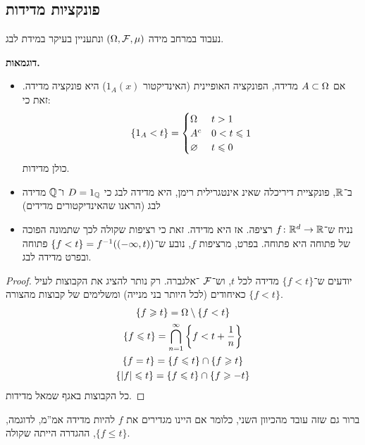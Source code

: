 \documentclass[name=רשימות פונקציות ממשיות – WIP]{../../../tex/classes/noChapterMegasumPreamble}
\newcommand \eqs        {\vspace{-13pt}}
\newcommand\q   {1}
\begin{document}
	\npage
	\section[פונקציות ממשיות מדידות]{}
	\subsection{פונקציות מדידות}
	
	נעבוד במרחב מידה $(\Omega, \mathcal{F}, \mu)$ ונתעניין בעיקר במידת לבג. 
	\defi{תהא $f \co \Og \to \R$. נגדיר $\{f < t\}$ להיות: 
	\[ \{f < t\} \cod \{x \in \Og \co f(x) < t\} = f\op\cl{(-\infty, t)} \]\eqs}
	
	\textbf{דוגמאות. }
	\begin{itemize}
		\item אם $A \subset \Omega$ מדידה, הפונקציה האופיינית (האינדיקטור $\q_A(x)$) היא פונקציה מדידה. זאת כי: 
		\[ \{1_A < t\} = \begin{cases}
			\Omega & t > 1 \\
			A^{c} & 0 < t \leqslant 1 \\
			\varnothing & t \leqslant 0
		\end{cases} \]
		כולן מדידות. 
		\item ב־$\mathbb{R}$, פונקציית דיריכלה שאינ אינטגרילית רימן, היא מדידה לבג כי $D = \q_\Q$ ו־$\mathbb{Q}$ מדידה לבג (הראנו שהאינדיקטורים מדידים)
		\item נניח ש־$f \colon \mathbb{R}^{d} \to \mathbb{R}$ רציפה. אז היא מדידה. זאת כי רציפות שקולה לכך שתמונה הפוכה של פתוחה היא פתוחה. בפרט, מרציפות $f$, נובע ש־$\{f < t\} = f^{-1}((-\infty, t))$ פתוחה ובפרט מדידה לבג. 
	\end{itemize}
	\begin{proof}
		יודעים ש־$\{f < t\}$ מדידה לכל $t$, וש־$\mathcal{F}$ \ס־אלגברה. רק נותר להציג את הקבוצות לעיל כאיחודים (לכל היותר בני מנייה) ומשלימים של קבוצות מהצורה $\{f < t\}$. 
		\begin{gather*}
			\{f \geqslant t\} = \Omega \setminus \{f < t\} \\
			\{f \leqslant t\} = \bigcap_{n = 1}^{\infty}\left \{ f < t + \frac{1}{n} \right \} \\
			\{f = t\} = \{f \leqslant t\} \cap \{f \geqslant t\} \\
			\{\left \lvert f \right \rvert \leqslant t\} = \{f \leqslant t\} \cap \{f \geqslant -t\}
		\end{gather*}
		כל הקבוצות באגף שמאל מדידות. 
	\end{proof}
	ברור גם שזה עובד מהכיוון השני, כלומר אם היינו מגדירים את $f$ להיות מדידה אמ''מ, לדוגמה, $\{f \le t\}$, ההגדרה הייתה שקולה. 
	
\end{document}

